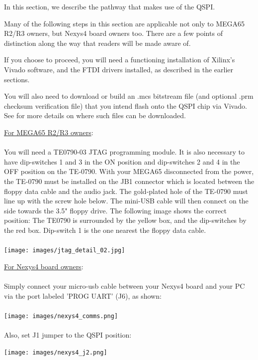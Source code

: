 In this section, we describe the pathway that makes use of the QSPI.

Many of the following steps in this section are applicable not only to MEGA65 R2/R3 owners, but Nexys4 board owners too. There are a few points of distinction along the way that readers will be made aware of.

If you choose to proceed, you will need a functioning installation of Xilinx's Vivado software, and the FTDI drivers installed, as described in the earlier sections.

You will also need to download or build an .mcs bitstream file (and optional .prm checksum verification file) that you intend flash onto the QSPI chip via Vivado. See  for more details on where such files can be downloaded.

\begin{tcolorbox}[colback=white,coltext=black]
\underline{For MEGA65 R2/R3 owners}:\\
\\
You will need a TE0790-03 JTAG programming module. It is also necessary to have
dip-switches 1 and 3 in the ON position and dip-switches 2 and 4 in the
OFF position on the TE-0790.
With your MEGA65 disconnected from the power, the TE-0790 must be
installed on the JB1 connector which is located between the floppy data cable and the audio jack.
The gold-plated hole of the TE-0790 must line up with the screw
hole below.  The mini-USB cable will then connect on the side towards the 3.5" floppy drive.
The following image shows the correct position: The TE0790 is surrounded by the yellow box,
and the dip-switches by the red box. Dip-switch 1 is the one nearest the floppy data cable. \\
\\
\texttt{[image: images/jtag\_detail\_02.jpg]}
\end{tcolorbox}

\begin{tcolorbox}[colback=white,coltext=black]
\underline{For Nexys4 board owners}: \\
\\
  Simply connect your micro-usb cable between your Nexys4 board and your PC via the port labeled 'PROG UART' (J6), as shown: \\
\\
\texttt{[image: images/nexys4\_comms.png]}
\\
\\
Also, set J1 jumper to the QSPI position:
\\
\begin{center}
  \texttt{[image: images/nexys4\_j2.png]}
\end{center}

\end{tcolorbox}

